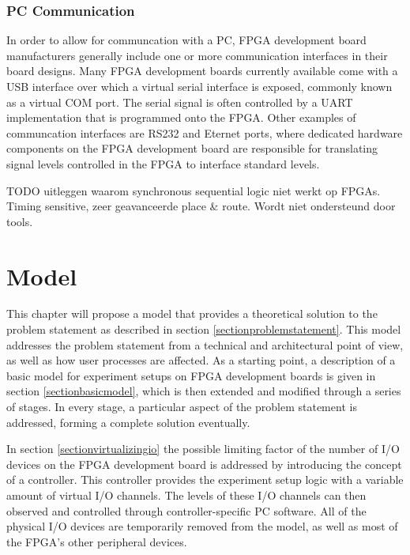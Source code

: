 \documentclass[openright]{template/uva-bachelor-thesis}
\begin{document}
\subsection{PC Communication}
In order to allow for communcation with a PC, FPGA development board manufacturers generally include one or more communication interfaces in their board designs. Many FPGA development boards currently available come with a USB interface over which a virtual serial interface is exposed, commonly known as a virtual COM port. The serial signal is often controlled by a UART implementation that is programmed onto the FPGA. Other examples of communcation interfaces are RS232 and Eternet ports, where dedicated hardware components on the FPGA development board are responsible for translating signal levels controlled in the FPGA to interface standard levels. 

TODO uitleggen waarom synchronous sequential logic niet werkt op FPGAs. Timing sensitive, zeer geavanceerde place \& route. Wordt niet ondersteund door tools. 


% 
% 

\chapter{Model}



This chapter will propose a model that provides a theoretical solution to the problem statement as described in section \ref{sectionproblemstatement}. This model addresses the problem statement from a technical and architectural point of view, as well as how user processes are affected. As a starting point, a description of a basic model for experiment setups on FPGA development boards is given in section \ref{sectionbasicmodel}, which is then extended and modified through a series of stages. In every stage, a particular aspect of the problem statement is addressed, forming a complete solution eventually. 

In section \ref{sectionvirtualizingio} the possible limiting factor of the  number of I/O devices on the FPGA development board is addressed by introducing the concept of a controller. This controller provides the experiment setup logic with a variable amount of virtual I/O channels. The levels of these I/O channels can then observed and controlled through controller-specific PC software. All of the physical I/O devices are temporarily removed from the model, as well as most of the FPGA's other peripheral devices.
\end{document}
